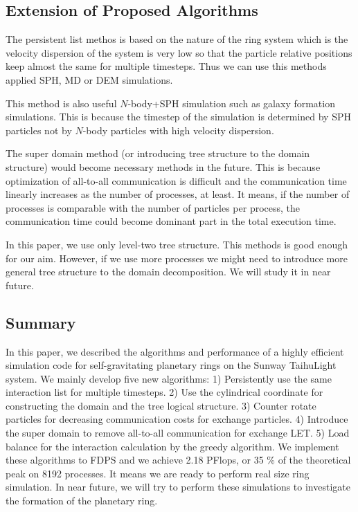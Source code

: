 \documentclass[oribibl]{llncs}
\begin{document}
\subsection{Extension of Proposed Algorithms}

The persistent list methos is based on the nature of the ring system
which is the velocity dispersion of the system is very low so that the
particle relative positions keep almost the same for multiple
timesteps. Thus we can use this methods applied SPH, MD or DEM
simulations.

This method is also useful $N$-body+SPH simulation such as galaxy
formation simulations. This is because the timestep of the simulation
is determined by SPH particles not by $N$-body particles with high
velocity dispersion.

The super domain method (or introducing tree structure to the domain
structure) would become necessary methods in the future. This is
because optimization of all-to-all communication is difficult and the
communication time linearly increases as the number of processes, at
least. It means, if the number of processes is comparable with the
number of particles per process, the communication time could become
dominant part in the total execution time.

In this paper, we use only level-two tree structure. This methods is
good enough for our aim. However, if we use more processes we might
need to introduce more general tree structure to the domain
decomposition. We will study it in near future.

\subsection{Summary}

In this paper, we described the algorithms and performance of a highly
efficient simulation code for self-gravitating planetary rings on the
Sunway TaihuLight system. We mainly develop five new algorithms: 1)
Persistently use the same interaction list for multiple timesteps. 2)
Use the cylindrical coordinate for constructing the domain and the
tree logical structure. 3) Counter rotate particles for decreasing
communication costs for exchange particles. 4) Introduce the super
domain to remove all-to-all communication for exchange LET. 5) Load
balance for the interaction calculation by the greedy algorithm. We
implement these algorithms to FDPS and we achieve 2.18 PFlops, or 35
\% of the theoretical peak on 8192 processes. It means we are ready to
perform real size ring simulation. In near future, we will try to
perform these simulations to investigate the formation of the
planetary ring.
\end{document}
